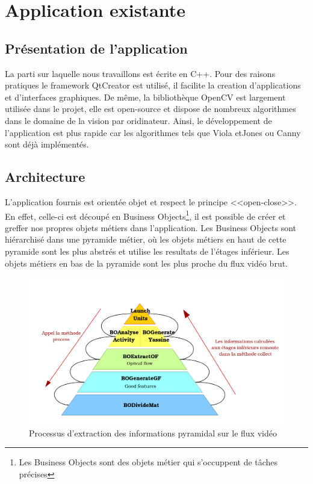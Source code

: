 \section{Application existante}

\subsection{Présentation de l'application}
La parti sur laquelle nous travaillons est écrite en C++. Pour des raisons pratiques le framework 
QtCreator est utilisé, il facilite la creation d'applications et d'interfaces graphiques. De même, 
la bibliothèque OpenCV  est largement utilisée dans le projet, elle est open-source et dispose de 
nombreux algorithmes dans le domaine de la vision par oridinateur. Ainsi, le développement de 
l'application est plus rapide car les algorithmes tels que Viola etJones ou Canny sont déjà implémentés.\\

\subsection{Architecture}
L'application fournis est orientée objet et respect le principe <<open-close>>. En effet, celle-ci est 
découpé en Business Objects\footnote{Les Business Objects sont des objets métier qui s'occuppent de tâches 
précises}, il est possible de créer et greffer nos propres objets métiers dans l'application. Les Business 
Objects sont hiérarchisé dans une pyramide métier, où les objets métiers en haut de cette pyramide 
sont les plus abstrés et utilise les resultats de l'étages inférieur. Les objets métiers en bas de 
la pyramide sont les plus proche du flux vidéo brut.\\

\begin{figure}[H]
  \centering
  \includegraphics[width=12.5cm]{image/pyramide.png}
  \caption{Processus d'extraction des informations pyramidal sur le flux vidéo}
\end{figure}

